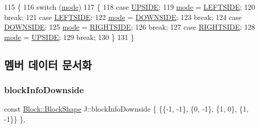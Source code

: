 \begin{DoxyCode}
115     \{
116         \textcolor{keywordflow}{switch} (\mbox{\hyperlink{class_j_a84f29c2144ce2c8ca0d369060589f0f4}{mode}})
117         \{
118         \textcolor{keywordflow}{case} \mbox{\hyperlink{class_block_a33a96023993478ad4b52426188454765a4529e89ca1c08cc5f81181e355719fad}{UPSIDE}}:
119             \mbox{\hyperlink{class_j_a84f29c2144ce2c8ca0d369060589f0f4}{mode}} = \mbox{\hyperlink{class_block_a33a96023993478ad4b52426188454765a9c855bf91465e7da98901d7900740919}{LEFTSIDE}};
120             \textcolor{keywordflow}{break};
121         \textcolor{keywordflow}{case} \mbox{\hyperlink{class_block_a33a96023993478ad4b52426188454765a9c855bf91465e7da98901d7900740919}{LEFTSIDE}}:
122             \mbox{\hyperlink{class_j_a84f29c2144ce2c8ca0d369060589f0f4}{mode}} = \mbox{\hyperlink{class_block_a33a96023993478ad4b52426188454765a73fd4ad0ff8642235ec8549f9290d13b}{DOWNSIDE}};
123             \textcolor{keywordflow}{break};
124         \textcolor{keywordflow}{case} \mbox{\hyperlink{class_block_a33a96023993478ad4b52426188454765a73fd4ad0ff8642235ec8549f9290d13b}{DOWNSIDE}}:
125             \mbox{\hyperlink{class_j_a84f29c2144ce2c8ca0d369060589f0f4}{mode}} = \mbox{\hyperlink{class_block_a33a96023993478ad4b52426188454765a005424e665ea0b83edfaf9ddb3ab85a1}{RIGHTSIDE}};
126             \textcolor{keywordflow}{break};
127         \textcolor{keywordflow}{case} \mbox{\hyperlink{class_block_a33a96023993478ad4b52426188454765a005424e665ea0b83edfaf9ddb3ab85a1}{RIGHTSIDE}}:
128             \mbox{\hyperlink{class_j_a84f29c2144ce2c8ca0d369060589f0f4}{mode}} = \mbox{\hyperlink{class_block_a33a96023993478ad4b52426188454765a4529e89ca1c08cc5f81181e355719fad}{UPSIDE}};
129             \textcolor{keywordflow}{break};
130         \}
131     \}
\end{DoxyCode}


\subsection{멤버 데이터 문서화}
\mbox{\label{class_j_a8729720907e14a70874f8daa0b3f2971}} 
\subsubsection{\texorpdfstring{block\+Info\+Downside}{blockInfoDownside}}
{\footnotesize\ttfamily const \mbox{\hyperlink{class_block_aca5d951639f113e2ebd7856209d6b9ab}{Block\+::\+Block\+Shape}} J\+::block\+Info\+Downside \{ \{\{-\/1, -\/1\}, \{0, -\/1\}, \{1, 0\}, \{1, -\/1\}\} \}\hspace{0.3cm}{\ttfamily [static]}, {\ttfamily [private]}}



